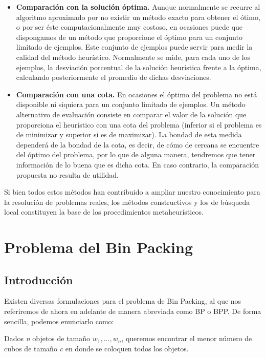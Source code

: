 \documentclass[a4paper, 12pt, oneside]{book}
\begin{document}
	\begin{itemize}
		\item \textbf{Comparaci\'on con la soluci\'on \'optima.} Aunque normalmente se recurre al algoritmo aproximado por no existir un m\'etodo exacto para obtener el \'otimo, o por ser \'este computacionalmente muy costoso, en ocasiones puede que dispongamos de un m\'etodo que proporcione el \'optimo para un conjunto limitado de ejemplos. Este conjunto de ejemplos puede servir para medir la calidad del m\'etodo heur\'istico. Normalmente se mide, para cada uno de los ejemplos, la desviaci\'on porcentual de la soluci\'on heur\'istica frente a la \'optima, calculando posteriormente el promedio de dichas desviaciones.
		\item \textbf{Comparaci\'on con una cota.}  En ocasiones el \'optimo del problema no est\'a disponible ni siquiera para un conjunto limitado de ejemplos. Un m\'etodo alternativo de evaluaci\'on consiste en comparar el valor de la soluci\'on que proporciona el heur\'istico con una cota del problema (inferior si el problema es de minimizar y superior si es de maximizar). La bondad de esta medida depender\'a de la bondad de la cota, es decir, de c\'omo de cercana se encuentre del \'optimo del problema, por lo que de alguna manera, tendremos que tener informaci\'on de lo buena que es dicha cota. En caso contrario, la comparaci\'on propuesta no resulta de utilidad.
	\end{itemize}
	
	Si bien todos estos m\'etodos han contribuido a ampliar nuestro conocimiento para la resoluci\'on de problemas reales, los m\'etodos constructivos y los de b\'usqueda local constituyen la base de los procedimientos metaheur\'isticos.
	
	
	
	
	\chapter{Problema del Bin Packing}
	
	\section{Introducci\'on}
	Existen diversas formulaciones para el problema de Bin Packing, al que nos referiremos de ahora en adelante de manera abreviada como BP o BPP. De forma sencilla, podemos enunciarlo como:
	
	\begin{center}
		Dados \textit{n} objetos de tama\~{n}o $w_{1},..., w_{n}$, queremos encontrar el menor n\'umero de cubos de tama\~{n}o \textit{c} en donde se coloquen todos los objetos.
	\end{center}
	
\end{document}
